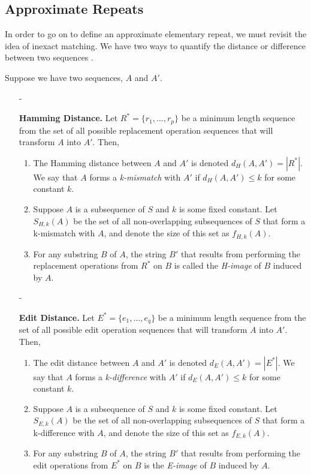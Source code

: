 \subsection{Approximate Repeats}
In order to go on to define an approximate elementary repeat, we must revisit the idea of inexact matching. We have two ways to quantify the distance or difference between two sequences \cite{kurtz2001reputer, zheng2005discovery}.
\begin{notate}
Suppose we have two sequences, $A$ and $A'$.
\begin{itemize}
\item[-]{\textbf{Hamming Distance.} Let $R^*=\lbrace r_{1}, \dotsc, r_{p}\rbrace$ be a minimum length sequence from the set of all possible replacement operation sequences that will transform $A$ into $A'$. Then,
\begin{enumerate}
\item{The Hamming distance between $A$ and $A'$ is denoted $d_{H}(A, A') = |R^*|$. We say that $A$ forms a \textit{k-mismatch} with $A'$ if $d_{H}(A, A') \leq k$ for some constant $k$.}
\item{Suppose $A$ is a subsequence of $S$ and $k$ is some fixed constant. Let $S_{H,k}(A)$ be the set of all non-overlapping subsequences of $S$ that form a k-mismatch with $A$, and denote the size of this set as $f_{H,k}(A)$.}
\item{For any substring $B$ of $A$, the string $B'$ that results from performing the replacement operations from $R^*$ on $B$ is called the \textit{H-image} of $B$ induced by $A$.}
\end{enumerate}}

\item[-]{\textbf{Edit Distance.} Let $E^*=\lbrace e_{1},\dotsc, e_{q} \rbrace$ be a minimum length sequence from the set of all possible edit operation sequences that will transform $A$ into $A'$. Then, 
\begin{enumerate}
\item{The edit distance between $A$ and $A'$ is denoted $d_{E}(A, A') = |E^*|$. We say that $A$ forms a \textit{k-difference} with $A'$ if $d_{E}(A, A') \leq k$ for some constant $k$.} 
\item{Suppose $A$ is a subsequence of $S$ and $k$ is some fixed constant. Let $S_{E,k}(A)$ be the set of all non-overlapping subsequences of $S$ that form a k-difference with $A$, and denote the size of this set as $f_{E,k}(A)$.}
\item{For any substring $B$ of $A$, the string $B'$ that results from performing the edit operations from $E^*$ on $B$ is the \textit{E-image} of $B$ induced by $A$.}
\end{enumerate}}
\end{itemize}
\end{notate}

